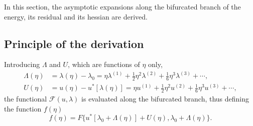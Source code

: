 \documentclass[12pt, final]{scrartcl}
\theoremstyle{definition}
\newcommand{\order}[2][1]{#2^{(#1)}}
\begin{document}
In this section, the asymptotic expansions along the bifurcated branch of the energy, its residual and its hessian are
derived.

\subsection{Principle of the derivation}
\label{sec:20220107121442}
%

Introducing $\Lambda$ and $U$, which are functions of $\eta$ only,
\begin{align}
  \label{eq:20211112155446}
  \Lambda(\eta) & = \lambda(\eta) - \lambda_0 = \eta \order[1]\lambda + \tfrac{1}{2} \eta^2 \order[2]\lambda + \tfrac{1}{6} \eta^3 \order[3]\lambda + \cdots,\\
  \label{eq:20211112113028}
  U(\eta) & = u(\eta) - u^{\ast}[\lambda(\eta)] = \eta \order[1]u + \tfrac{1}{2} \eta^2 \order[2]u + \tfrac{1}{6} \eta^3 \order[3]u + \cdots,
\end{align}
the functional $\mathcal{F}(u, \lambda)$ is evaluated along the bifurcated branch, thus defining the function $f(\eta)$
\begin{equation*}
  f(\eta) = F\{ u^{\ast} [\lambda_0 + \Lambda(\eta)] + U(\eta), \lambda_0 + \Lambda(\eta) \}.
\end{equation*}
\end{document}
